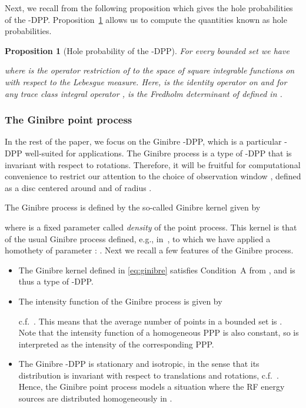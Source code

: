\documentclass[12pt,draftclsnofoot,onecolumn]{IEEEtran}
\newtheorem{prop}{Proposition}
\begin{document}
Next, we recall from \cite{Soshnikov} the following proposition which gives the hole probabilities of the -DPP.
Proposition~\ref{prop:holeproba} allows us to compute the quantities known as hole probabilities. 
\begin{prop}[Hole probability of the -DPP]
\label{prop:holeproba}
 For every bounded set  we have 

where  is the operator restriction of  to the space  of square integrable functions on  with respect to the Lebesgue measure. Here,  is the identity operator on  and for any trace class integral operator ,  is the Fredholm determinant of  defined in \cite{Brezis}.


 
\end{prop}



\subsubsection{The Ginibre point process}

In the rest of the paper, we focus on the Ginibre -DPP, which is a particular -DPP well-suited for applications. The Ginibre process is a type of -DPP that is invariant with respect to rotations. Therefore, it will be fruitful for computational convenience to restrict our attention to the choice of observation window , defined as a disc centered around  and of radius .

The Ginibre process is defined by the so-called Ginibre kernel given by

where  is a fixed parameter called {\em density} of the point process.
This kernel is that of the usual Ginibre process defined, e.g., in~\cite{DecreusefondFlintVergne}, to which we have applied a homothety of parameter : . Next we recall a few features of the Ginibre process. 
\begin{itemize} 
\item
The Ginibre kernel  defined in \eqref{eq:ginibre} satisfies Condition~A from \cite{ShiraiTakahashi}, and is thus a type of -DPP.
\item The intensity function of the Ginibre process 
is given by 
 
 c.f.~\cite{ShiraiTakahashi}. This means that the average number of points in a bounded set  is . Note that the intensity function of a homogeneous PPP is also constant, so  is interpreted as the intensity of the corresponding PPP.
\\ 
 
\item 
The Ginibre -DPP is stationary and isotropic, in the sense that its distribution is invariant with respect to translations and rotations, c.f.~\cite{DecreusefondFlintVergne}. Hence, the Ginibre point process models a situation where the RF energy sources are distributed homogeneously in .
\end{itemize} 
\end{document}
